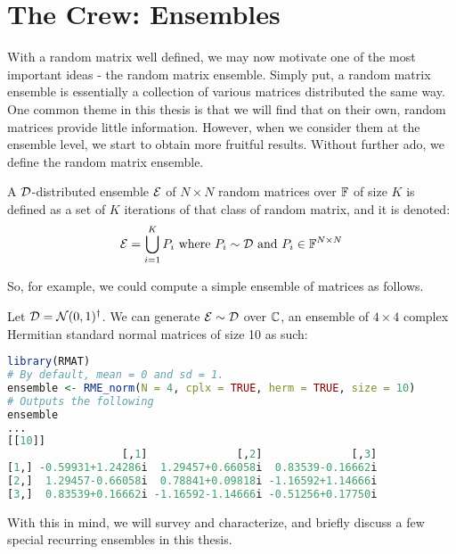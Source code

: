 \newpage


\section{The Crew: Ensembles}

With a random matrix well defined, we may now motivate one of the most important ideas - the random matrix ensemble.
Simply put, a random matrix ensemble is essentially a collection of various matrices distributed the same way.
One common theme in this thesis is that we will find that on their own, random matrices provide little information. However, when we consider them at the ensemble level, we start to obtain more fruitful results.
Without further ado, we define the random matrix ensemble.

\begin{definition}
A $\mathcal{D}$-distributed ensemble $\mathcal{E}$ of $N \times N$ random matrices over $\mathbb{F}$ of size $K$ is defined as a set of $K$ iterations of that class of random matrix, and it is denoted:
$$ \mathcal{E} = \bigcup_{i = 1}^K P_i \text{ where } P_i \sim \mathcal{D} \text{ and } P_i \in \mathbb{F}^{N \times N} $$
\end{definition}

\medskip
 So, for example, we could compute a simple ensemble of matrices as follows.
\begin{code}
Let $\mathcal{D} = \mathcal{N}(0,1)^{\dagger}$. We can generate $\mathcal{E} \sim \mathcal{D}$ over $\mathbb{C}$, an ensemble of $4 \times 4$ complex Hermitian standard normal matrices of size 10 as such:
\end{code}

\begin{lstlisting}[language=R]
library(RMAT)
# By default, mean = 0 and sd = 1.
ensemble <- RME_norm(N = 4, cplx = TRUE, herm = TRUE, size = 10)
# Outputs the following
ensemble
...
[[10]]
                  [,1]              [,2]              [,3]
[1,] -0.59931+1.24286i  1.29457+0.66058i  0.83539-0.16662i
[2,]  1.29457-0.66058i  0.78841+0.09818i -1.16592+1.14666i
[3,]  0.83539+0.16662i -1.16592-1.14666i -0.51256+0.17750i
\end{lstlisting}

With this in mind, we will survey and characterize, and briefly discuss a few special recurring ensembles in this thesis.

